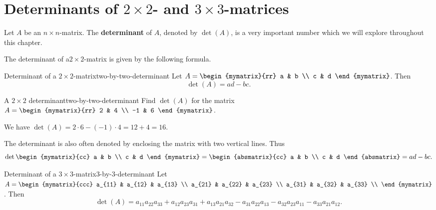 \section{Determinants of \texorpdfstring{$2\times 2$}{2x2}- and \texorpdfstring{$3\times 3$}{3x3}-matrices}

Let $A$ be an $n\times n$-matrix. The \textbf{determinant}%
 of $A$, denoted by $\det(A)$, is a very important
number which we will explore throughout this chapter.

The determinant of a$2\times 2$-matrix is given by the following
formula.

\begin{definition}{Determinant of a $2\times 2$-matrix}{two-by-two-determinant}
  Let $A=\begin{mymatrix}{rr}
    a & b \\
    c & d
  \end{mymatrix}$. Then
  \begin{equation*}
    \det(A) = ad-bc.
  \end{equation*}
\end{definition}

\begin{example}{A $2\times 2$ determinant}{two-by-two-determinant}
  Find $\det(A)$ for the matrix
  $A =  \begin{mymatrix}{rr}
    2 & 4 \\
    -1 & 6
  \end{mymatrix}$.
\end{example}

\begin{solution}
  We have $\det(A) = 2\cdot 6 - (-1)\cdot 4 = 12 + 4 = 16$.
\end{solution}

The determinant is also often denoted by enclosing the matrix with two
vertical lines. Thus
\begin{equation*}
  \det \begin{mymatrix}{cc}
    a & b \\
    c & d
  \end{mymatrix} =\begin{absmatrix}{cc}
    a & b \\
    c & d
  \end{absmatrix}
  = ad - bc.
\end{equation*}

\begin{definition}{Determinant of a $3\times 3$-matrix}{3-by-3-determinant}
  Let $A=\begin{mymatrix}{ccc}
    a_{11} & a_{12} & a_{13} \\
    a_{21} & a_{22} & a_{23} \\
    a_{31} & a_{32} & a_{33} \\
  \end{mymatrix}$. Then
  \begin{equation*}
    \det(A)
    = a_{11}a_{22}a_{33}
    + a_{12}a_{23}a_{31}
    + a_{13}a_{21}a_{32}
    - a_{31}a_{22}a_{13}
    - a_{32}a_{23}a_{11}
    - a_{33}a_{21}a_{12}.
  \end{equation*}
\end{definition}

